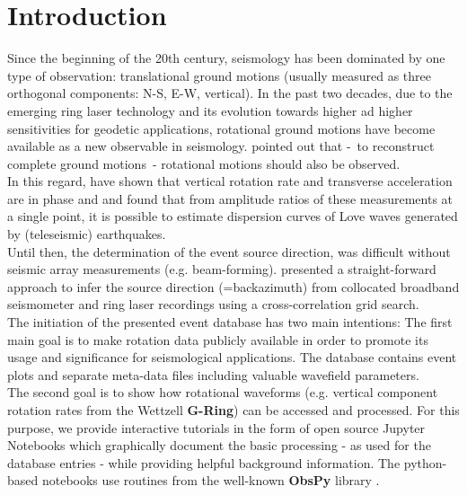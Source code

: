 \documentclass[12pt,reqno,letter]{article}
\begin{document}
\section*{Introduction}
Since the beginning of the 20th century, seismology has been dominated by one type of observation: translational ground motions (usually measured as three orthogonal components: N-S, E-W, vertical). In the past two decades, due to the emerging ring laser technology  and its evolution towards higher ad higher sensitivities \citep{Stedman1997,Schreiber2013} for geodetic applications, rotational ground motions have become available as a new observable in seismology.
\cite{AkiRichards2002} pointed out that -~to reconstruct complete ground motions~- rotational motions should also be observed.
\\ 
In this regard, \cite{McLeod1998, Pancha2000} have shown that vertical rotation rate and transverse acceleration are in phase and \cite{Igel2005,Igel2007} and \cite{Kurrle2010} found that from amplitude ratios of these measurements at a single point, it is possible to estimate dispersion curves of Love waves generated by (teleseismic) earthquakes.\\
Until then,  the determination of the event source direction, was difficult without seismic array measurements (e.g. beam-forming).  \cite{Igel2007} presented a straight-forward approach to infer the source direction (=backazimuth) from  collocated broadband seismometer and ring laser recordings using a cross-correlation grid search.\\

The initiation of the presented event database has two main intentions:
The first main goal is to make  rotation data publicly available in order to promote its usage and significance for seismological applications. The  database contains event plots and separate meta-data files including valuable  wavefield parameters.\\
The second goal is to show how rotational waveforms (e.g. vertical component rotation rates from the Wettzell \textbf{G-Ring}) can be accessed and processed. For this purpose, we provide interactive tutorials in the form of open source Jupyter Notebooks \citep{Perez2007} which graphically document the basic processing - as used for the database entries - while providing helpful background information. The python-based notebooks use routines from the well-known \textbf{ObsPy} library \citep{Megies2011,Krischer2015}.
\end{document}
